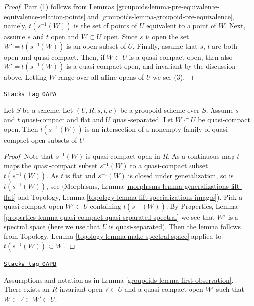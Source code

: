 \begin{proof}

Part (1) follows from
Lemmas \ref{groupoids-lemma-pre-equivalence-equivalence-relation-points} and
\ref{groupoids-lemma-groupoid-pre-equivalence}, namely, $t(s^{-1}(W))$
is the set of points of $U$ equivalent to a point of $W$.
Next, assume $s$ and $t$ open and $W \subset U$ open.
Since $s$ is open the set $W' = t(s^{-1}(W))$ is an open subset of $U$.
Finally, assume that $s$, $t$ are both open and quasi-compact.
Then, if $W \subset U$ is a quasi-compact open, then also
$W' = t(s^{-1}(W))$ is a quasi-compact open, and invariant by the
discussion above. Letting $W$ range over all affine opens of $U$
we see (3).
\end{proof}

\begin{lemma}
\label{groupoids-lemma-first-observation}
\href{https://stacks.math.columbia.edu/tag/0APA}{\texttt{Stacks tag 0APA}}

Let $S$ be a scheme. Let $(U, R, s, t, c)$ be a groupoid scheme over $S$.
Assume $s$ and $t$ quasi-compact and flat and $U$ quasi-separated.
Let $W \subset U$ be quasi-compact open. Then $t(s^{-1}(W))$
is an intersection of a nonempty family of quasi-compact open subsets of $U$.
\end{lemma}

\begin{proof}
Note that $s^{-1}(W)$ is quasi-compact open in $R$.
As a continuous map $t$ maps the quasi-compact subset
$s^{-1}(W)$ to a quasi-compact subset $t(s^{-1}(W))$.
As $t$ is flat and $s^{-1}(W)$ is closed under generalization,
so is $t(s^{-1}(W))$, see
(Morphisms, Lemma \ref{morphisms-lemma-generalizations-lift-flat} and
Topology, Lemma \ref{topology-lemma-lift-specializations-images}).
Pick a quasi-compact open $W' \subset U$ containing $t(s^{-1}(W))$. By
Properties, Lemma \ref{properties-lemma-quasi-compact-quasi-separated-spectral}
we see that $W'$ is a spectral space (here we use that $U$ is quasi-separated).
Then the lemma follows from
Topology, Lemma \ref{topology-lemma-make-spectral-space}
applied to $t(s^{-1}(W)) \subset W'$.
\end{proof}

\begin{lemma}
\label{groupoids-lemma-second-observation}
\href{https://stacks.math.columbia.edu/tag/0APB}{\texttt{Stacks tag 0APB}}

Assumptions and notation as in Lemma \ref{groupoids-lemma-first-observation}.
There exists an $R$-invariant open $V \subset U$ and a quasi-compact
open $W'$ such that $W \subset V \subset W' \subset U$.
\end{lemma}

